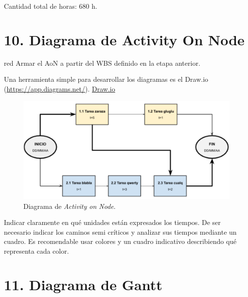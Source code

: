 \documentclass[
11pt, %
codirector, %
]{charter}
\begin{document}
Cantidad total de horas: 680 h.

\section{10. Diagrama de Activity On Node}
\label{sec:AoN}

\begin{consigna}{red}
Armar el AoN a partir del WBS definido en la etapa anterior.

Una herramienta simple para desarrollar los diagramas es el Draw.io (\url{https://app.diagrams.net/}).
\href{https://app.diagrams.net}{Draw.io}


\begin{figure}[htpb]
\centering 
\includegraphics[width=.8\textwidth]{./Figuras/AoN.png}
\caption{Diagrama de \textit{Activity on Node}.}
\label{fig:AoN}
\end{figure}

Indicar claramente en qué unidades están expresados los tiempos.
De ser necesario indicar los caminos semi críticos y analizar sus tiempos mediante un cuadro.
Es recomendable usar colores y un cuadro indicativo describiendo qué representa cada color.

\end{consigna}

\section{11. Diagrama de Gantt}
\label{sec:gantt}
\end{document}
